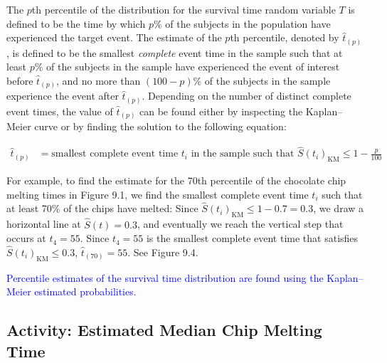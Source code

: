 \documentclass[
]{book}
\begin{document}
The \(p\)th percentile of the distribution for the survival time random variable \(T\) is defined to be the time by which \(p\%\) of the subjects in the population have experienced the target event. The estimate of the \(p\)th percentile, denoted by \(\hat t_{(p)}\), is defined to be the smallest \emph{complete} event time in the sample such that at least \(p\%\) of the subjects in the sample have experienced the event of interest before \(\hat t_{(p)}\), and no more than \((100 - p)\%\) of the subjects in the sample experience the event after \(\hat t_{(p)}\). Depending on the number of distinct complete event times, the value of \(\hat t_{(p)}\) can be found either by inspecting the Kaplan--Meier curve or by finding the solution to the following equation:

\begin{align}\label{9.5}
\hat t_{(p)} &= \text{smallest complete event time }t_i\text{ in the sample such that } \hat S(t_i)_{\mathrm{KM}} \le 1 - \frac{p}{100}
\tag{9.5}
\end{align}

For example, to find the estimate for the 70th percentile of the chocolate chip melting times in Figure 9.1, we find the smallest complete event time \(t_i\) such that at least 70\% of the chips have melted: Since \(\hat S(t_i)_{\mathrm{KM}} \le 1 - 0.7 = 0.3\), we draw a horizontal line at \(\hat S(t) = 0.3\), and eventually we reach the vertical step that occurs at \(t_4 = 55\). Since \(t_4 = 55\) is the smallest complete event time that satisfies \(\hat S(t_i)_{\mathrm{KM}} \le 0.3\), \(\hat t_{(70)} = 55\). See Figure 9.4.

\textcolor{blue}{Percentile estimates of the survival time distribution are found using the Kaplan–Meier estimated probabilities.}

\hypertarget{activity-estimated-median-chip-melting-time}{%
\subsection*{Activity: Estimated Median Chip Melting Time}\label{activity-estimated-median-chip-melting-time}}
\end{document}

